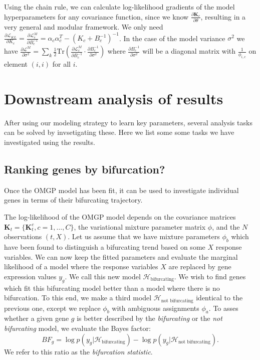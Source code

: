 Using the chain rule, we can calculate log-likelihood gradients of the model hyperparameters for any covariance function, since we know $ \frac{\partial \bm{K}_c}{\partial \mathbb{\theta}} $, resulting in a very general and modular framework. We only need
$ \frac{\partial \mathcal{L}_{KL}}{\partial K_c} =
\frac{\partial \mathcal{L}^{M}_c}{\partial B_c^{-1}} =
\alpha_c \alpha_c^T  - (K_c + B_c^{-1})^{-1} $.
In the case of the model variance $ \sigma^2 $ we have
$ \frac{\partial \mathcal{L}^{M}}{\partial \sigma^2} =
\sum_k \frac{1}{2} \text{Tr} \left( \frac{\partial \mathcal{L}^{M}_c}{\partial B_c^{-1}} \cdot
\frac{\partial B_c^{-1}}{\partial \sigma^2} \right) $
where $ \frac{\partial B_c^{-1}}{\partial \sigma^2} $ will be a diagonal matrix with
$ \frac{1}{\phi_{i, c}} $ on element $ (i, i) $ for all $ i $.

\section{Downstream analysis of  results}

After using our modeling strategy to learn key parameters, several analysis tasks can be solved by invsetigating these. Here we list some some tasks we have investigated using the results.

\subsection{Ranking genes by bifurcation?}

Once the OMGP model has been fit, it can be used to investigate individual genes in terms of their bifurcating trajectory.

The log-likelihood of the OMGP model depends on the covariance matrices $ \mathbf{K}_t = \{ \bm{K}^c_t, c=1, \ldots, C\} $, the variational mixture parameter matrix $ \phi $, and the $ N $ observations $ (t, X) $. Let us assume that we have mixture parameters $ \phi_{b} $ which have been found to distinguish a bifurcating trend based on some $ X $ response variables. We can now keep the fitted parameters and evaluate the marginal likelihood of a model where the response variables $ X $ are replaced by gene expression values $ y_g $. We call this new model $ \mathcal{H}_\text{bifurcating} $. We wish to find genes which fit this bifurcating model better than a model where there is no bifurcation. To this end, we make a third model $ \mathcal{H}_\text{not bifurcating} $ identical to the previous one, except we replace $ \phi_{b} $ with ambiguous assignments $ \phi_a $. To asses whether a given gene $ g $ is better described by the \textit{bifurcating} or the \textit{not bifurcating} model, we evaluate the Bayes factor:
$$
BF_{g} = \log p(y_g | \mathcal{H}_\text{bifurcating}) - \log p(y_g | \mathcal{H}_\text{not bifurcating}).
$$
We refer to this ratio as the \textit{bifurcation statistic}.

